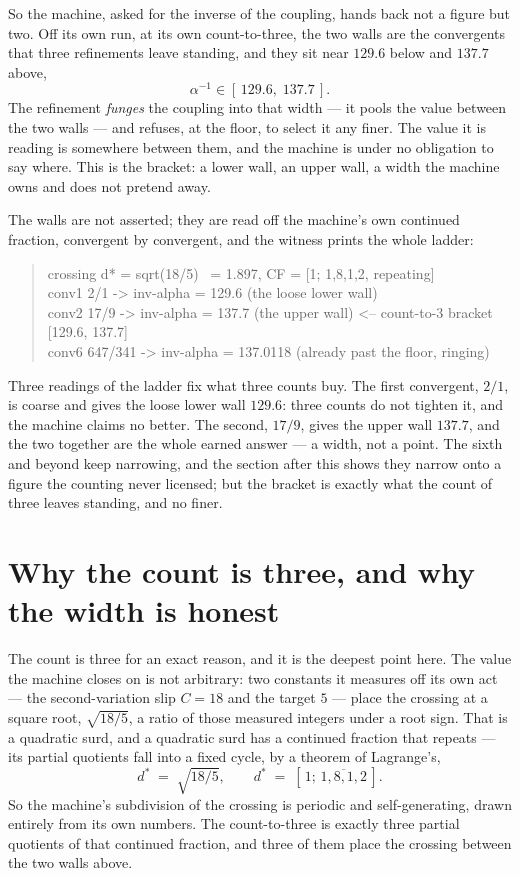 So the machine, asked for the inverse of the coupling, hands back not a figure but two.
Off its own run, at its own count-to-three, the two walls are the convergents that three refinements leave
standing, and they sit near $129.6$ below and $137.7$ above,
\[
  \alpha^{-1} \in [\,129.6,\; 137.7\,] .
\]
The refinement \emph{funges} the coupling into that width --- it pools the value between the two walls --- and refuses,
at the floor, to select it any finer.
The value it is reading is somewhere between them, and the machine is under no obligation to say where.
This is the bracket: a lower wall, an upper wall, a width the machine owns and does not pretend away.

The walls are not asserted; they are read off the machine's own continued fraction, convergent by convergent, and the
witness prints the whole ladder:
\begin{quote}\ttfamily
crossing d* = sqrt(18/5) ~= 1.897,   CF = [1; 1,8,1,2, repeating]\\
conv1   2/1    -> inv-alpha = 129.6     (the loose lower wall)\\
conv2  17/9    -> inv-alpha = 137.7     (the upper wall)   <-- count-to-3 bracket [129.6, 137.7]\\
conv6 647/341  -> inv-alpha = 137.0118  (already past the floor, ringing)
\end{quote}
Three readings of the ladder fix what three counts buy.
The first convergent, $2/1$, is coarse and gives the loose lower wall $129.6$: three counts do not tighten it, and the
machine claims no better.
The second, $17/9$, gives the upper wall $137.7$, and the two together are the whole earned answer --- a width, not a point.
The sixth and beyond keep narrowing, and the section after this shows they narrow onto a figure the counting never
licensed; but the bracket is exactly what the count of three leaves standing, and no finer.

\section{Why the count is three, and why the width is honest}

The count is three for an exact reason, and it is the deepest point here.
The value the machine closes on is not arbitrary: two constants it measures off its own act --- the second-variation slip $C=18$ and the target $5$ --- place the crossing at a square root, $\sqrt{18/5}$,
a ratio of those measured integers under a root sign.
That is a quadratic surd, and a quadratic surd has a continued fraction that repeats --- its partial quotients fall into
a fixed cycle, by a theorem of Lagrange's,
\[
  d^{*} \;=\; \sqrt{18/5}, \qquad d^{*} \;=\; [\,1;\, \overline{1,8,1,2}\,] .
\]
So the machine's subdivision of the crossing is periodic and self-generating, drawn entirely from its own numbers.
The count-to-three is exactly three partial quotients of that continued fraction, and three of them place the crossing
between the two walls above.

